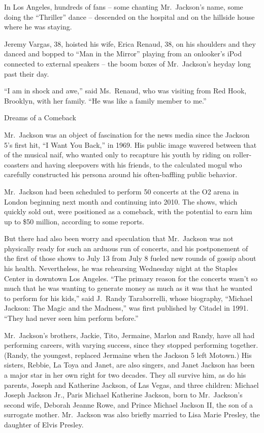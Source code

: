 ﻿\documentclass[12pt]{article}
\begin{document}
In Los Angeles, hundreds of fans -- some chanting Mr.~Jackson's name, some doing the ``Thriller''
dance -- descended on the hospital and on the hillside house where he was staying.

Jeremy Vargas, 38, hoisted his wife, Erica Renaud, 38, on his shoulders and they danced and bopped
to ``Man in the Mirror'' playing from an onlooker's iPod connected to external speakers -- the boom
boxes of Mr.~Jackson's heyday long past their day.

``I am in shock and awe,'' said Ms.~Renaud, who was visiting from Red Hook, Brooklyn, with her
family. ``He was like a family member to me.''

Dreams of a Comeback

Mr.~Jackson was an object of fascination for the news media since the Jackson 5's first hit, ``I
Want You Back,'' in 1969. His public image wavered between that of the musical naif, who wanted only
to recapture his youth by riding on roller-coasters and having sleepovers with his friends, to the
calculated mogul who carefully constructed his persona around his often-baffling public behavior.

Mr.~Jackson had been scheduled to perform 50 concerts at the O2 arena in London beginning next month
and continuing into 2010. The shows, which quickly sold out, were positioned as a comeback, with the
potential to earn him up to \$50 million, according to some reports.

But there had also been worry and speculation that Mr.~Jackson was not physically ready for such an
arduous run of concerts, and his postponement of the first of those shows to July 13 from July 8
fueled new rounds of gossip about his health. Nevertheless, he was rehearsing Wednesday night at the
Staples Center in downtown Los Angeles. ``The primary reason for the concerts wasn't so much that he
was wanting to generate money as much as it was that he wanted to perform for his kids,'' said
J.~Randy Taraborrelli, whose biography, ``Michael Jackson: The Magic and the Madness,'' was first
published by Citadel in 1991. ``They had never seen him perform before.''

Mr.~Jackson's brothers, Jackie, Tito, Jermaine, Marlon and Randy, have all had performing careers,
with varying success, since they stopped performing together. (Randy, the youngest, replaced
Jermaine when the Jackson 5 left Motown.) His sisters, Rebbie, La Toya and Janet, are also singers,
and Janet Jackson has been a major star in her own right for two decades. They all survive him, as
do his parents, Joseph and Katherine Jackson, of Las Vegas, and three children: Michael Joseph
Jackson Jr., Paris Michael Katherine Jackson, born to Mr.~Jackson's second wife, Deborah Jeanne
Rowe, and Prince Michael Jackson II, the son of a surrogate mother. Mr.~Jackson was also briefly
married to Lisa Marie Presley, the daughter of Elvis Presley.
\end{document}
